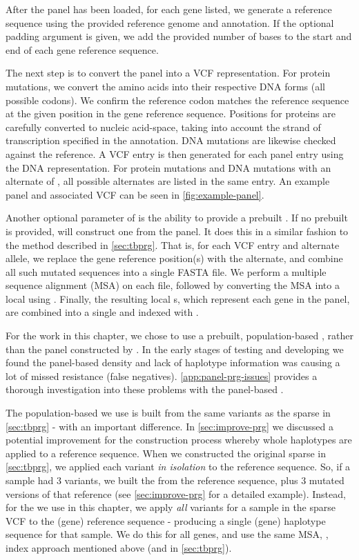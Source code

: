 After the panel has been loaded, for each gene listed, we generate a reference sequence using the provided reference genome and annotation. If the optional padding argument is given, we add the provided number of bases to the start and end of each gene reference sequence.

The next step is to convert the panel into a VCF representation. For protein mutations, we convert the amino acids into their respective DNA forms (all possible codons). We confirm the reference codon matches the reference sequence at the given position in the gene reference sequence. Positions for proteins are carefully converted to nucleic acid-space, taking into account the strand of transcription specified in the annotation. DNA mutations are likewise checked against the reference. A VCF entry is then generated for each panel entry using the DNA representation. For protein mutations and DNA mutations with an alternate of , all possible alternates are listed in the same entry. An example panel and associated VCF can be seen in \autoref{fig:example-panel}.

Another optional parameter of \drprg{}  is the ability to provide a prebuilt \prg{}. If no prebuilt \prg{} is provided, \drprg{} will construct one from the panel. It does this in a similar fashion to the method described in \autoref{sec:tbprg}. That is, for each VCF entry and alternate allele, we replace the gene reference position(s) with the alternate, and combine all such mutated sequences into a single FASTA file. We perform a multiple sequence alignment (MSA) on each file, followed by converting the MSA into a local \prg{} using \makeprg{}. Finally, the resulting local \prg{}s, which represent each gene in the panel, are combined into a single \prg{} and indexed with \pandora{}.

For the work in this chapter, we chose to use a prebuilt, population-based \prg{}, rather than the panel \prg{} constructed by \drprg{}. In the early stages of testing and developing \drprg{} we found the panel-based \prg{} density and lack of haplotype information was causing a lot of missed resistance (false negatives). \autoref{app:panel-prg-issues} provides a thorough investigation into these problems with the panel-based \prg{}.

The population-based \prg{} we use is built from the same variants as the sparse \prg{} in \autoref{sec:tbprg} - with an important difference. In \autoref{sec:improve-prg} we discussed a potential improvement for the \prg{} construction process whereby whole haplotypes are applied to a reference sequence. When we constructed the original sparse \prg{} in \autoref{sec:tbprg}, we applied each variant \emph{in isolation} to the reference sequence. So, if a sample had 3 variants, we built the \prg{} from the reference sequence, plus 3 mutated versions of that reference (see \autoref{sec:improve-prg} for a detailed example). Instead, for the \prg{} we use in this chapter, we apply \emph{all} variants for a sample in the sparse VCF to the (gene) reference sequence - producing a single (gene) haplotype sequence for that sample. We do this for all genes, and use the same MSA, \makeprg{}, \pandora{} index approach mentioned above (and in \autoref{sec:tbprg}).


